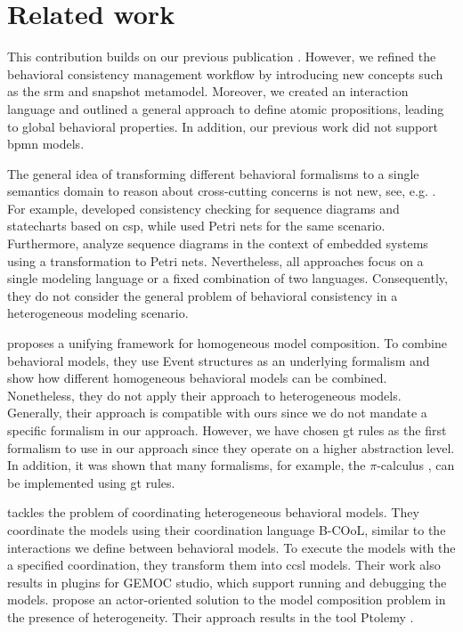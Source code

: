 \documentclass{jot}
\begin{document}
\section{Related work} \label{sec:related_work}
This contribution builds on our previous publication \cite{krauterBehavioralConsistencyHeterogeneous2021}.
However, we refined the behavioral consistency management workflow by introducing new concepts such as the \gls*{srm} and snapshot metamodel.
Moreover, we created an interaction language and outlined a general approach to define atomic propositions, leading to global behavioral properties.
In addition, our previous work did not support \gls*{bpmn} models.

The general idea of transforming different behavioral formalisms to a single semantics domain to reason about cross-cutting concerns is not new, see, e.g. \cite{engelsMethodologySpecifyingAnalyzing2001}.
For example, \cite{kusterExplicitBehavioralConsistency2003} developed consistency checking for sequence diagrams and statecharts based on \gls*{csp}, while \cite{yaoConsistencyCheckingUML2006} used Petri nets for the same scenario.
Furthermore, \cite{cunhaFormalVerificationUML2011} analyze sequence diagrams in the context of embedded systems using a transformation to Petri nets.
Nevertheless, all approaches focus on a single modeling language or a fixed combination of two languages.
Consequently, they do not consider the general problem of behavioral consistency in a heterogeneous modeling scenario.

\cite{kienzleUnifyingFrameworkHomogeneous2019} proposes a unifying framework for homogeneous model composition.
To combine behavioral models, they use Event structures \cite{winskelEventStructures1987} as an underlying formalism and show how different homogeneous behavioral models can be combined.
Nonetheless, they do not apply their approach to heterogeneous models.
Generally, their approach is compatible with ours since we do not mandate a specific formalism in our approach.
However, we have chosen \gls*{gt} rules as the first formalism to use in our approach since they operate on a higher abstraction level.
In addition, it was shown that many formalisms, for example, the $\pi$-calculus \cite{gadducciGraphRewritingPcalculus2007}, can be implemented using \gls*{gt} rules.

\cite{varalarsenBehavioralCoordinationOperator2015} tackles the problem of coordinating heterogeneous behavioral models.
They coordinate the models using their coordination language B-COoL, similar to the interactions we define between behavioral models.
To execute the models with the a specified coordination, they transform them into \gls*{ccsl} models.  
Their work also results in plugins for GEMOC studio, which support running and debugging the models.
\cite{ekerTamingHeterogeneityPtolemy2003, leeDisciplinedHeterogeneousModeling2010} propose an actor-oriented solution to the model composition problem in the presence of heterogeneity.
Their approach results in the tool Ptolemy \cite{ptolemaeusSystemDesignModeling2014}.
\end{document}
